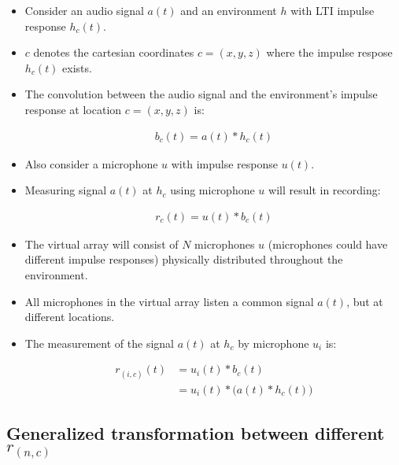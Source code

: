 \documentclass[14pt]{extarticle}
\begin{document}
\begin{itemize}

\item Consider an audio signal $a(t)$ and an environment $h$ with LTI impulse response $h_c(t)$.

\item $c$ denotes the cartesian coordinates $c=(x,y,z)$ where the impulse respose $h_c(t)$ exists.

\item The convolution between the audio signal and the environment's impulse response at location $c=(x,y,z)$ is: 

\begin{align}
b_c(t) = a(t) \ast h_c(t)
\end{align}

\item Also consider a microphone $u$ with impulse response $u(t)$. 

\item Measuring signal $a(t)$ at $h_c$ using microphone $u$ will result in recording: 

\begin{align}
r_c(t) = u(t) \ast b_c(t)
\end{align}

\item The virtual array will consist of $N$ microphones $u$ (microphones could have different impulse responses) physically distributed throughout the environment.

\item All microphones in the virtual array listen a common signal $a(t)$, but at different locations. 
\item The measurement of the signal $a(t)$ at $h_c$ by microphone $u_i$ is:

\begin{align*}
r_{(i,c)}(t) &= u_i(t) \ast b_{c}(t) \\
	&= u_i(t) \ast \big(a(t) \ast h_{c}(t)\big)
\end{align*}

\end{itemize}

\subsection{Generalized transformation between different $r_{(n,c)}$}
\end{document}

